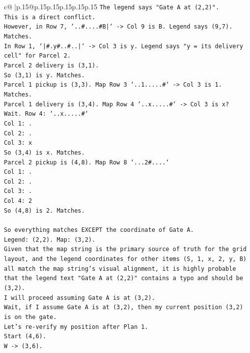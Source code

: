 \documentclass{article}
\begin{document}
{\begin{supertabular}{c@{$\;$}|p{.15\linewidth}@{}p{.15\linewidth}p{.15\linewidth}p{.15\linewidth}p{.15\linewidth}p{.15\linewidth}}
{{{\texttt{The legend says "Gate A at (2,2)".} \\
\texttt{This is a direct conflict.} \\
\texttt{However, in Row 7, `..\#....\#B|` {-}> Col 9 is B. Legend says (9,7). Matches.} \\
\texttt{In Row 1, `|\#.y\#..\#..|` {-}> Col 3 is y. Legend says "y = its delivery cell" for Parcel 2.} \\
\texttt{Parcel 2 delivery is (3,1).} \\
\texttt{So (3,1) is y. Matches.} \\
\texttt{Parcel 1 pickup is (3,3). Map Row 3 `..1.....\#` {-}> Col 3 is 1. Matches.} \\
\texttt{Parcel 1 delivery is (3,4). Map Row 4 `..x.....\#` {-}> Col 3 is x?} \\
\texttt{Wait. Row 4: `..x.....\#`} \\
\texttt{Col 1: .} \\
\texttt{Col 2: .} \\
\texttt{Col 3: x} \\
\texttt{So (3,4) is x. Matches.} \\
\texttt{Parcel 2 pickup is (4,8). Map Row 8 `...2\#....`} \\
\texttt{Col 1: .} \\
\texttt{Col 2: .} \\
\texttt{Col 3: .} \\
\texttt{Col 4: 2} \\
\texttt{So (4,8) is 2. Matches.} \\
\\ 
\texttt{So everything matches EXCEPT the coordinate of Gate A.} \\
\texttt{Legend: (2,2). Map: (3,2).} \\
\texttt{Given that the map string is the primary source of truth for the grid layout, and the legend coordinates for other items (S, 1, x, 2, y, B) all match the map string's visual alignment, it is highly probable that the legend text "Gate A at (2,2)" contains a typo and should be (3,2).} \\
\texttt{I will proceed assuming Gate A is at (3,2).} \\
\texttt{Wait, if I assume Gate A is at (3,2), then my current position (3,2) is on the gate.} \\
\texttt{Let's re{-}verify my position after Plan 1.} \\
\texttt{Start (4,6).} \\
\texttt{W {-}> (3,6).} \\
}}}
\end{supertabular}}
\end{document}
